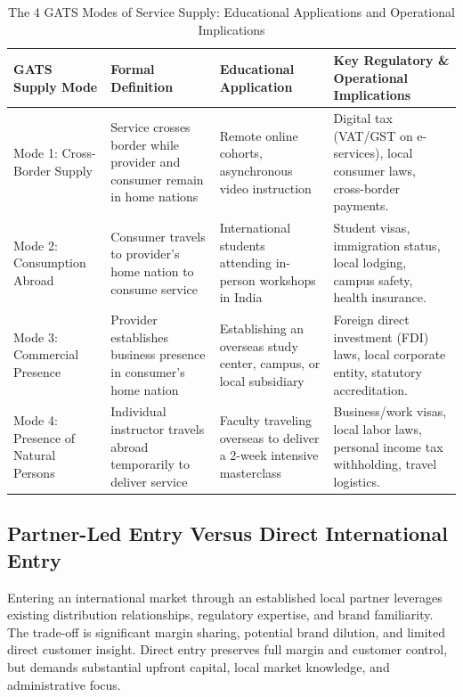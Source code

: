 \begin{table}[t]
\centering
\small
\caption{The 4 GATS Modes of Service Supply: Educational Applications and Operational Implications}
\label{tab:gats_four_modes}
\begin{tabularx}{\textwidth}{p{3.2cm} p{3.4cm} p{3.2cm} X}
\toprule
\textbf{GATS Supply Mode} & \textbf{Formal Definition} & \textbf{Educational Application} & \textbf{Key Regulatory \& Operational Implications} \\
\midrule
Mode 1: Cross-Border Supply & Service crosses border while provider and consumer remain in home nations & Remote online cohorts, asynchronous video instruction & Digital tax (VAT/GST on e-services), local consumer laws, cross-border payments. \\
Mode 2: Consumption Abroad & Consumer travels to provider's home nation to consume service & International students attending in-person workshops in India & Student visas, immigration status, local lodging, campus safety, health insurance. \\
Mode 3: Commercial Presence & Provider establishes business presence in consumer's home nation & Establishing an overseas study center, campus, or local subsidiary & Foreign direct investment (FDI) laws, local corporate entity, statutory accreditation. \\
Mode 4: Presence of Natural Persons & Individual instructor travels abroad temporarily to deliver service & Faculty traveling overseas to deliver a 2-week intensive masterclass & Business/work visas, local labor laws, personal income tax withholding, travel logistics. \\
\bottomrule
\end{tabularx}
\end{table}

\subsection{Partner-Led Entry Versus Direct International Entry}
\label{sec:partner_led_versus_direct_entry}

Entering an international market through an established local partner leverages existing distribution relationships, regulatory expertise, and brand familiarity. The trade-off is significant margin sharing, potential brand dilution, and limited direct customer insight. Direct entry preserves full margin and customer control, but demands substantial upfront capital, local market knowledge, and administrative focus.

